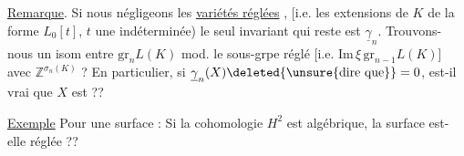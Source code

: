 \uline{Remarque}. Si nous négligeons les \uline{variétés réglées} , [i.e. les extensions  de $K$ de  la forme $L_0[t]$, $t$ une indéterminée) le seul invariant  qui reste est $\underline{\gamma}_n$. Trouvons-nous un isom entre $\mathrm{gr}_n L(K)$ mod. le sous-grpe réglé [i.e. $\mathrm{Im}\,\xi\,\mathrm{gr}_{n-1}L(K)$] avec $\mathbb Z^{\sigma_n(K)}$ ? En particulier, si $\underline{\gamma}_n(X)\deleted{\text{\unsure{dire que}}}=0$, est-il vrai que $X$ est  ??

\uline{Exemple} Pour une surface : Si la cohomologie $H^2$ est algébrique, la surface est-elle réglée ??

